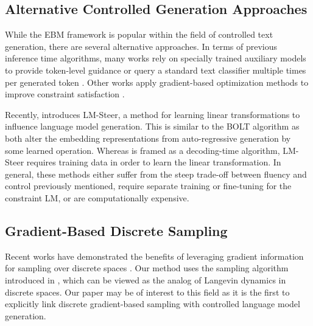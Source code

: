 \subsection{Alternative Controlled Generation Approaches}
While the EBM framework is popular within the field of controlled text generation, there are several alternative approaches. In terms of previous inference time algorithms, many works rely on specially trained auxiliary models to provide token-level guidance \citep{krause2020gedi, yang2021fudge, liu-etal-2021-dexperts, meng2022controllable, kim2022critic} or query a standard text classifier multiple times per generated token \citep{dekoninck2023controlled, sitdikov2022classifiers}. Other works apply gradient-based optimization methods to improve constraint satisfaction \citep{qin2020back, dathathri2020plugplaylanguagemodels}. 

Recently, \citet{han2023lm} introduces LM-Steer, a method for learning linear transformations to influence language model generation. This is similar to the BOLT algorithm \citet{liu2023bolt} as both alter the embedding representations from auto-regressive generation by some learned operation. Whereas \citet{liu2023bolt} is framed as a decoding-time algorithm, LM-Steer requires training data in order to learn the linear transformation. In general, these methods either suffer from the steep trade-off between fluency and control previously mentioned, require separate training or fine-tuning for the constraint LM, or are computationally expensive.

\subsection{Gradient-Based Discrete Sampling}
Recent works have demonstrated the benefits of leveraging gradient information for sampling over discrete spaces \citep{grathwohl2021gwg, sun2023anyscale, goshvadi2023discs, sun2023discrete, pynadath2024gradientbaseddiscretesamplingautomatic}. 
Our method uses the sampling algorithm introduced in \citet{zhang2022langevinlike}, which can be viewed as the analog of Langevin dynamics \citep{robertsstramer2002langevinmh} in discrete spaces. 
Our paper may be of interest to this field as it is the first to explicitly link discrete gradient-based sampling with controlled language model generation.